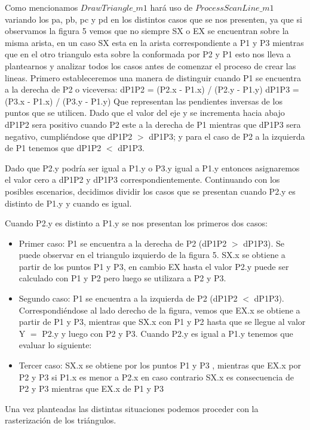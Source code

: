 \documentclass[a4paper]{article}
\begin{document}
Como mencionamos $DrawTriangle\_m1$ hará uso de $ProcessScanLine\_m1$ variando los pa, pb, pc y pd en los distintos casos que se nos presenten, ya que si observamos la figura 5 vemos que no siempre SX o EX se encuentran sobre la misma arista, en un caso SX esta en la arista correspondiente a P1 y P3 mientras que en el otro triangulo esta sobre la conformada por P2 y P1 esto nos lleva a plantearnos y analizar todos los casos antes de comenzar el proceso de crear las lineas.
Primero estableceremos una manera de distinguir cuando P1 se encuentra a la derecha de P2 o viceversa: 
dP1P2 = (P2.x - P1.x) / (P2.y - P1.y) 
dP1P3 = (P3.x - P1.x) / (P3.y - P1.y)
Que representan las pendientes inversas de los puntos que se utilicen. Dado que el valor del eje y se incrementa hacia abajo dP1P2 sera positivo cuando P2 este a la derecha de P1 mientras que dP1P3 sera negativo, cumpliéndose que dP1P2 $>$ dP1P3; y para el caso de P2 a la izquierda de P1 tenemos que dP1P2 $<$ dP1P3. \par Dado que P2.y podría ser igual a P1.y o P3.y igual a P1.y entonces asignaremos el valor cero a dP1P2 y dP1P3 correspondientemente.
Continuando con los posibles escenarios, decidimos dividir los casos que se presentan cuando P2.y es distinto de P1.y y cuando es igual.\newline
\par Cuando P2.y es distinto a P1.y se nos presentan los primeros dos casos:
 
\begin{itemize}
\item Primer caso: P1 se encuentra a la derecha de P2 (dP1P2 $>$ dP1P3). Se puede observar en el triangulo izquierdo de la figura 5. SX.x se obtiene a partir de los puntos P1 y P3, en cambio EX hasta el valor P2.y puede ser calculado con P1 y P2 pero luego se utilizara a P2 y P3.
\item Segundo caso: P1 se encuentra a la izquierda de P2 (dP1P2 $<$ dP1P3). Correspondiéndose al lado derecho de la figura, vemos que EX.x se obtiene a partir de P1 y P3, mientras que SX.x con P1 y P2 hasta que se llegue al valor Y $=$ P2.y y luego con P2 y P3. 
Cuando P2.y es igual a P1.y tenemos que evaluar lo siguiente:
\item Tercer caso:  SX.x se obtiene por los puntos P1 y P3 , mientras que EX.x por P2 y P3 si P1.x es menor a P2.x en caso contrario SX.x es consecuencia de P2 y P3 mientras que EX.x de P1 y P3 
\end{itemize}
Una vez planteadas las distintas situaciones podemos proceder con la rasterización de los triángulos. 
  
\end{document}

